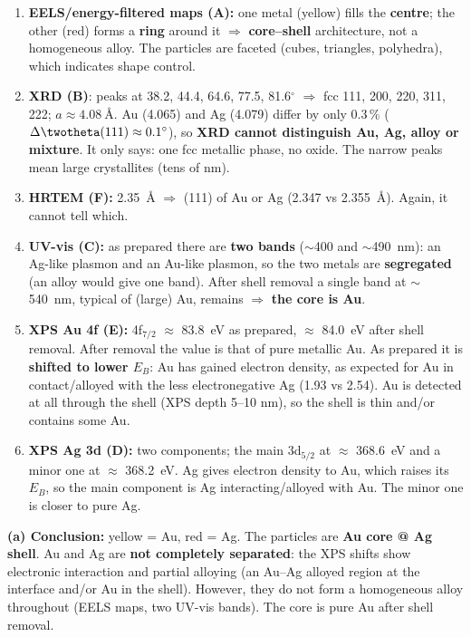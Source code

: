 \begin{enumerate}
  \item \textbf{EELS/energy-filtered maps (A):} one metal (yellow) fills the \textbf{centre}; the other (red) forms a
        \textbf{ring} around it $\Rightarrow$ \textbf{core--shell} architecture, not a homogeneous alloy. The particles are
        faceted (cubes, triangles, polyhedra), which indicates shape control.
  \item \textbf{XRD (B)}\readoff: peaks at 38.2, 44.4, 64.6, 77.5, 81.6$^\circ$ $\Rightarrow$ fcc 111, 200, 220, 311, 222;
        $a\approx\SI{4.08}{\angstrom}$. Au (4.065) and Ag (4.079) differ by only 0.3\,\% ($\Delta\twotheta(111)\approx0.1^\circ$),
        so \textbf{XRD cannot distinguish Au, Ag, alloy or mixture}. It only says: one fcc metallic phase, no oxide.
        The narrow peaks mean large crystallites (tens of nm).
  \item \textbf{HRTEM (F):} \SI{2.35}{\angstrom} $\Rightarrow$ (111) of Au or Ag (2.347 vs \SI{2.355}{\angstrom}). Again, it cannot tell
        which.
  \item \textbf{UV-vis (C):} as prepared there are \textbf{two bands} ($\sim$400 and $\sim$\SI{490}{nm}\readoff): an Ag-like plasmon
        and an Au-like plasmon, so the two metals are \textbf{segregated} (an alloy would give one band). After shell removal
        a single band at $\sim$\SI{540}{nm}, typical of (large) Au, remains $\Rightarrow$ \textbf{the core is Au}.
  \item \textbf{XPS Au 4f (E):} 4f$_{7/2}$ $\approx$ \SI{83.8}{eV} as prepared, $\approx$ \SI{84.0}{eV} after shell removal\readoff.
        After removal the value is that of pure metallic Au. As prepared it is \textbf{shifted to lower $E_B$}: Au has gained
        electron density, as expected for Au in contact/alloyed with the less electronegative Ag (1.93 vs 2.54).
        Au is detected at all through the shell (XPS depth 5--10 nm), so the shell is thin and/or contains some Au.
  \item \textbf{XPS Ag 3d (D):} two components; the main 3d$_{5/2}$ at $\approx$ \SI{368.6}{eV} and a minor one at
        $\approx$ \SI{368.2}{eV}\readoff. Ag gives electron density to Au, which raises its $E_B$, so the main component is Ag
        interacting/alloyed with Au. The minor one is closer to pure Ag.
\end{enumerate}
\textbf{(a) Conclusion:} yellow = Au, red = Ag. The particles are \textbf{Au core @ Ag shell}. Au and Ag are \textbf{not
completely separated}: the XPS shifts show electronic interaction and partial alloying (an Au--Ag alloyed region at the
interface and/or Au in the shell). However, they do not form a homogeneous alloy throughout (EELS maps, two UV-vis bands).
The core is pure Au after shell removal.


